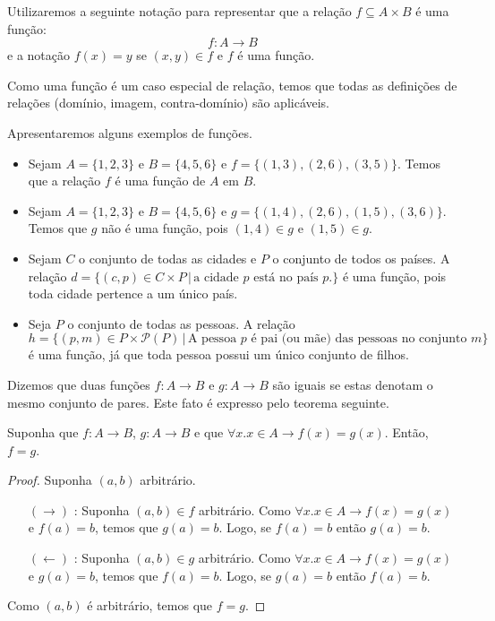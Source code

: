 \begin{Notation}
Utilizaremos a seguinte notação para representar que a relação $f
\subseteq A \times B$ é uma função:
\[
f : A \to B
\]
e a notação $f(x) = y$ se $(x,y) \in f$ e $f$ é uma função.
\end{Notation}
Como uma função é um caso especial de relação, temos que todas as
definições de relações (domínio, imagem, contra-domínio) são aplicáveis.
\begin{Example}
Apresentaremos alguns exemplos de funções.
\begin{itemize}
  \item Sejam $A = \{1,2,3\}$ e $B =\{4,5,6\}$ e $f =
    \{(1,3),(2,6),(3,5)\}$. Temos que a relação $f$ é uma função de
    $A$ em $B$.
  \item Sejam $A = \{1,2,3\}$ e $B =\{4,5,6\}$ e $g =
    \{(1,4),(2,6),(1,5),(3,6)\}$. Temos que $g$ não é uma função, pois
     $(1,4) \in g$ e $(1,5) \in g$.
  \item Sejam $C$ o conjunto de todas as cidades e $P$ o conjunto de
    todos os países. A relação $d =\{(c,p)\in C \times P\,|\,\text{a
      cidade $p$ está no país $p$.}\}$ é uma função, pois toda cidade
    pertence a um único país.
  \item Seja $P$ o conjunto de todas as pessoas. A relação $h =
    \{(p,m)\in P \times \mathcal{P}(P)\,|\,\text{A pessoa $p$  é pai
      (ou mãe) das pessoas no conjunto $m$}\}$ é uma função, já que
    toda pessoa possui um único conjunto de filhos.
\end{itemize}
\end{Example}
Dizemos que duas funções $f : A \to B$ e $g : A \to B$ são iguais se
estas denotam o mesmo conjunto de pares. Este fato é expresso pelo
teorema seguinte.
\begin{Theorem}[Extensionalidade]
Suponha que $f : A \to B$, $g : A \to B$ e que $\forall x. x\in A \to
f(x) = g(x)$. Então, $f = g$.
\end{Theorem}
\begin{proof}
Suponha $(a,b)$ arbitrário.
\begin{enumerate}
  \item[$(\to)$]: Suponha $(a,b) \in f$ arbitrário.
                     Como $\forall x. x\in A \to f(x) = g(x)$ e $f(a)
                     = b$, temos que $g(a) = b$. Logo, se $f(a) = b$
                     então $g(a) = b$.
   \item[$(\leftarrow)$]: Suponha $(a,b) \in g$ arbitrário.
                     Como $\forall x. x\in A \to f(x) = g(x)$ e $g(a)
                     = b$, temos que $f(a) = b$. Logo, se $g(a) = b$
                     então $f(a) = b$.
\end{enumerate}
Como $(a,b)$ é arbitrário, temos que $f = g$.
\end{proof}

